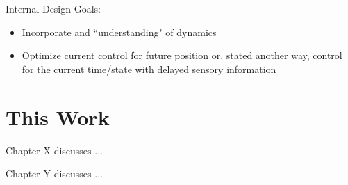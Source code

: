 Internal Design Goals:
\begin{itemize}
\item Incorporate and ``understanding" of dynamics
\item Optimize current control for future position or, stated another way,
control for the current time/state with delayed sensory information
\end{itemize}

\section{This Work}

Chapter X discusses ...

Chapter Y discusses ...

